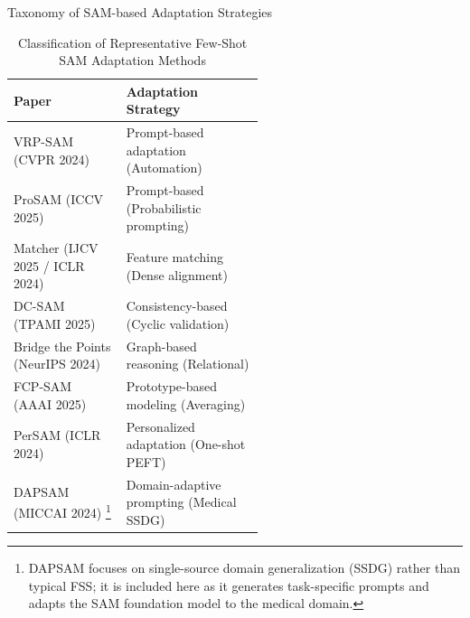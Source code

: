 \documentclass[aspectratio=169, 10pt]{beamer}
\begin{document}
\begin{frame}{Taxonomy of SAM-based Adaptation Strategies}
    \begin{table}[htbp]
    \centering
    \caption{Classification of Representative Few-Shot SAM Adaptation Methods}
    \renewcommand{\arraystretch}{1.05}
    \small
    \begin{tabular}{l p{0.55\linewidth}}
    \toprule
    \textbf{Paper} & \textbf{Adaptation Strategy} \\
    \midrule
    VRP-SAM (CVPR 2024) \cite{sun2024vrp} & Prompt-based adaptation (Automation) \\
    ProSAM (ICCV 2025) \cite{wang2025prosam} & Prompt-based (Probabilistic prompting) \\
    Matcher (IJCV 2025 / ICLR 2024) \cite{liu2023matcher} & Feature matching (Dense alignment) \\
    DC-SAM (TPAMI 2025) \cite{qi2025dcsam} & Consistency-based (Cyclic validation) \\
    Bridge the Points (NeurIPS 2024) \cite{zhang2024bridge} & Graph-based reasoning (Relational) \\
    FCP-SAM (AAAI 2025) \cite{park2025fcpsam} & Prototype-based modeling (Averaging) \\
    PerSAM (ICLR 2024) \cite{zhang2024persam} & Personalized adaptation (One-shot PEFT) \\
    DAPSAM (MICCAI 2024) \cite{wei2024prompting} \footnote{\tiny DAPSAM focuses on single-source domain generalization (SSDG) rather than typical FSS; it is included here as it generates task-specific prompts and adapts the SAM foundation model to the medical domain.} & Domain-adaptive prompting (Medical SSDG) \\
    \bottomrule
    \end{tabular}
    \end{table}
\end{frame}
\end{document}

